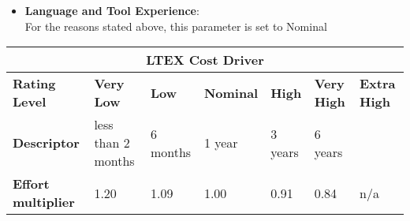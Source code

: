 \begin{itemize}
\item \textbf{Language and Tool Experience}:\\
For the reasons stated above, this parameter is set to Nominal
\end{itemize}
\hspace*{-3cm}\begin{tabular}{|p{3cm}|p{2cm}|p{2cm}|p{2cm}|p{2cm}|p{2cm}|p{2cm}|}
\hline
\multicolumn{7}{|c|}{\textbf{LTEX Cost Driver}}\\
\hline
\hline
\textbf{Rating Level} & \textbf{Very Low} & \textbf{Low} & \textbf{Nominal} & \textbf{High} & \textbf{Very High} & \textbf{Extra High}\\
\hline
\textbf{Descriptor} & less than 2 months & 6 months & 1 year & 3 years & 6 years & \\
\hline
\textbf{Effort multiplier} & 1.20 & 1.09 & 1.00 & 0.91 & 0.84 & n/a\\
\hline 
\end{tabular}
